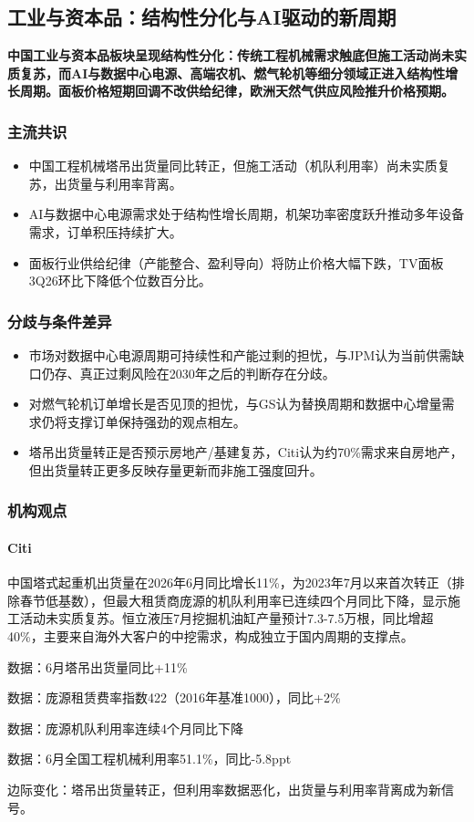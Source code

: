 \documentclass[11pt]{ctexart}
\begin{document}
\subsection{工业与资本品：结构性分化与AI驱动的新周期}
\textbf{中国工业与资本品板块呈现结构性分化：传统工程机械需求触底但施工活动尚未实质复苏，而AI与数据中心电源、高端农机、燃气轮机等细分领域正进入结构性增长周期。面板价格短期回调不改供给纪律，欧洲天然气供应风险推升价格预期。}
\subsubsection*{主流共识}
\begin{itemize}
  \item 中国工程机械塔吊出货量同比转正，但施工活动（机队利用率）尚未实质复苏，出货量与利用率背离。
  \item AI与数据中心电源需求处于结构性增长周期，机架功率密度跃升推动多年设备需求，订单积压持续扩大。
  \item 面板行业供给纪律（产能整合、盈利导向）将防止价格大幅下跌，TV面板3Q26环比下降低个位数百分比。
\end{itemize}
\subsubsection*{分歧与条件差异}
\begin{itemize}
  \item 市场对数据中心电源周期可持续性和产能过剩的担忧，与JPM认为当前供需缺口仍存、真正过剩风险在2030年之后的判断存在分歧。
  \item 对燃气轮机订单增长是否见顶的担忧，与GS认为替换周期和数据中心增量需求仍将支撑订单保持强劲的观点相左。
  \item 塔吊出货量转正是否预示房地产/基建复苏，Citi认为约70\%需求来自房地产，但出货量转正更多反映存量更新而非施工强度回升。
\end{itemize}
\subsubsection*{机构观点}
\paragraph{Citi} 中国塔式起重机出货量在2026年6月同比增长11\%，为2023年7月以来首次转正（排除春节低基数），但最大租赁商庞源的机队利用率已连续四个月同比下降，显示施工活动未实质复苏。恒立液压7月挖掘机油缸产量预计7.3-7.5万根，同比增超40\%，主要来自海外大客户的中挖需求，构成独立于国内周期的支撑点。
{\small\color{refgray}数据：6月塔吊出货量同比+11\%\par}
{\small\color{refgray}数据：庞源租赁费率指数422（2016年基准1000），同比+2\%\par}
{\small\color{refgray}数据：庞源机队利用率连续4个月同比下降\par}
{\small\color{refgray}数据：6月全国工程机械利用率51.1\%，同比-5.8ppt\par}
{\small\color{refgray}边际变化：塔吊出货量转正，但利用率数据恶化，出货量与利用率背离成为新信号。\par}
\end{document}
